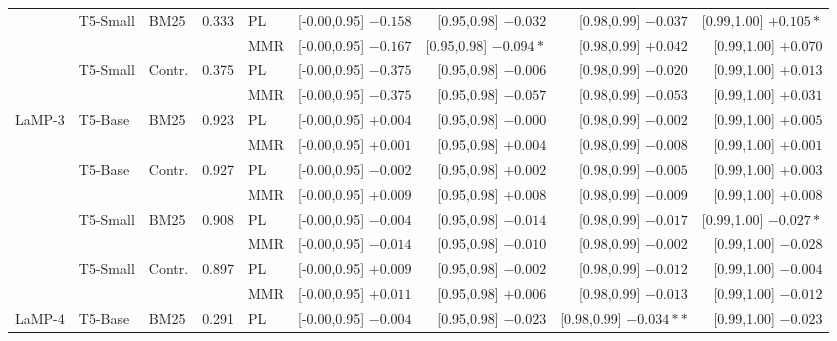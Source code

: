 \documentclass[10pt]{article}
\begin{document}
\begin{table}[p]
\begin{tabular}{@{}lllrlrrrr@{}}
\cmidrule(lr){1-9}
 & \multirow{2}{*}{T5-Small} & \multirow{2}{*}{BM25} & \multirow{2}{*}{0.333} & PL & [-0.00,0.95] $-0.158$ & [0.95,0.98] $-0.032$ & [0.98,0.99] $-0.037$ & [0.99,1.00] $+0.105*$ \\
 &  &  &  & MMR & [-0.00,0.95] $-0.167$ & [0.95,0.98] $-0.094*$ & [0.98,0.99] $+0.042$ & [0.99,1.00] $+0.070$ \\
\cmidrule(lr){1-9}
 & \multirow{2}{*}{T5-Small} & \multirow{2}{*}{Contr.} & \multirow{2}{*}{0.375} & PL & [-0.00,0.95] $-0.375$ & [0.95,0.98] $-0.006$ & [0.98,0.99] $-0.020$ & [0.99,1.00] $+0.013$ \\
 &  &  &  & MMR & [-0.00,0.95] $-0.375$ & [0.95,0.98] $-0.057$ & [0.98,0.99] $-0.053$ & [0.99,1.00] $+0.031$ \\
\midrule
\multirow{2}{*}{LaMP-3} & \multirow{2}{*}{T5-Base} & \multirow{2}{*}{BM25} & \multirow{2}{*}{0.923} & PL & [-0.00,0.95] $+0.004$ & [0.95,0.98] $-0.000$ & [0.98,0.99] $-0.002$ & [0.99,1.00] $+0.005$ \\
 &  &  &  & MMR & [-0.00,0.95] $+0.001$ & [0.95,0.98] $+0.004$ & [0.98,0.99] $-0.008$ & [0.99,1.00] $+0.001$ \\
\cmidrule(lr){1-9}
 & \multirow{2}{*}{T5-Base} & \multirow{2}{*}{Contr.} & \multirow{2}{*}{0.927} & PL & [-0.00,0.95] $-0.002$ & [0.95,0.98] $+0.002$ & [0.98,0.99] $-0.005$ & [0.99,1.00] $+0.003$ \\
 &  &  &  & MMR & [-0.00,0.95] $+0.009$ & [0.95,0.98] $+0.008$ & [0.98,0.99] $-0.009$ & [0.99,1.00] $+0.008$ \\
\cmidrule(lr){1-9}
 & \multirow{2}{*}{T5-Small} & \multirow{2}{*}{BM25} & \multirow{2}{*}{0.908} & PL & [-0.00,0.95] $-0.004$ & [0.95,0.98] $-0.014$ & [0.98,0.99] $-0.017$ & [0.99,1.00] $-0.027*$ \\
 &  &  &  & MMR & [-0.00,0.95] $-0.014$ & [0.95,0.98] $-0.010$ & [0.98,0.99] $-0.002$ & [0.99,1.00] $-0.028$ \\
\cmidrule(lr){1-9}
 & \multirow{2}{*}{T5-Small} & \multirow{2}{*}{Contr.} & \multirow{2}{*}{0.897} & PL & [-0.00,0.95] $+0.009$ & [0.95,0.98] $-0.002$ & [0.98,0.99] $-0.012$ & [0.99,1.00] $-0.004$ \\
 &  &  &  & MMR & [-0.00,0.95] $+0.011$ & [0.95,0.98] $+0.006$ & [0.98,0.99] $-0.013$ & [0.99,1.00] $-0.012$ \\
\midrule
\multirow{2}{*}{LaMP-4} & \multirow{2}{*}{T5-Base} & \multirow{2}{*}{BM25} & \multirow{2}{*}{0.291} & PL & [-0.00,0.95] $-0.004$ & [0.95,0.98] $-0.023$ & [0.98,0.99] $-0.034**$ & [0.99,1.00] $-0.023$ \\

\end{tabular}
\end{table}
\end{document}
